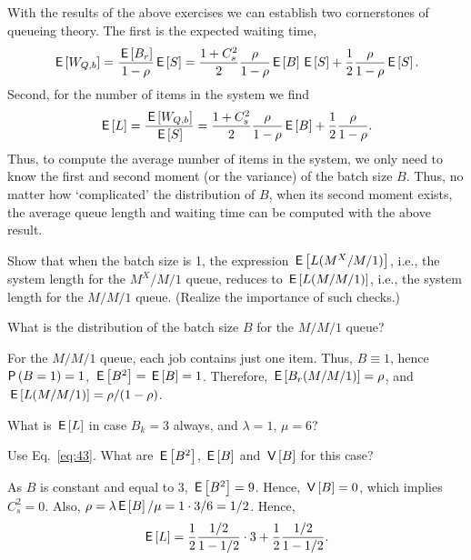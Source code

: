 With the results of the above exercises we can establish two cornerstones of queueing theory. The first is the expected waiting time, 
\begin{equation}
\,\mathsf{E}\left[W_{Q,b}\right] = \frac{\,\mathsf{E}\left[B_r\right]}{1-\rho} \,\mathsf{E}\left[S\right] = 
\frac{1+C_s^2}2 \frac{\rho}{1-\rho} \,\mathsf{E}\left[B\right] \,\mathsf{E}\left[S\right] + \frac12\frac\rho{1-\rho}\,\mathsf{E}\left[S\right].
\end{equation}
Second, for the number of items in the system we find
\begin{equation}\label{eq:43}
\,\mathsf{E}\left[L\right]  =\frac{\,\mathsf{E}\left[W_{Q,b}\right]}{\,\mathsf{E}\left[S\right]} =  
\frac{1+C_s^2}2 \frac{\rho}{1-\rho} \,\mathsf{E}\left[B\right] + \frac12\frac\rho{1-\rho}.
\end{equation}
Thus, to compute the average number of items in the system, we only
need to know the first and second moment (or the variance) of the
batch size $B$. Thus, no matter how `complicated' the distribution of
$B$, when its second moment exists, the average queue length and
waiting time can be computed with the above result. 

\begin{exercise}
  Show that  when the batch size is 1, the expression $\,\mathsf{E}\left[L(M^X/M/1)\right]$, i.e., the system length for the $M^X/M/1$ queue, reduces to
  $\,\mathsf{E}\left[L(M/M/1)\right]$, i.e., the system length for the $M/M/1$ queue. 
(Realize the importance of such checks.)
  \begin{hint}
What is the    distribution of the batch size $B$ for the $M/M/1$ queue?
  \end{hint}
  \begin{solution}
    For the $M/M/1$ queue, each job contains just one item. Thus,
    $B\equiv 1$, hence $\P{B=1}=1$, $\,\mathsf{E}\left[B^2\right]=\,\mathsf{E}\left[B\right] =1$. Therefore,
    $\,\mathsf{E}\left[B_r(M/M/1)\right]= \rho$, and $\,\mathsf{E}\left[L(M/M/1)\right]=\rho/(1-\rho)$. 
  \end{solution}
\end{exercise}


\begin{exercise}
  What is $\,\mathsf{E}\left[L\right]$ in case $B_k=3$ always, and $\lambda=1$, $\mu=6$?  
  \begin{hint}
Use Eq.~\eqref{eq:43}. What are $\,\mathsf{E}\left[B^2\right]$, $\,\mathsf{E}\left[B\right]$ and $\,\mathsf{V}\left[B\right]$ for this case?
  \end{hint}
\begin{solution}
  As $B$ is constant and equal to 3, $\,\mathsf{E}\left[B^2\right]=9$. Hence, $\,\mathsf{V}\left[B\right]=0$, which implies
 $C_s^2=0$.  Also, $\rho=\lambda\,\mathsf{E}\left[B\right]/\mu=1\cdot 3/6=1/2$. Hence,
  \begin{equation*}
    \,\mathsf{E}\left[L\right] = \frac 1 2 \frac{1/2}{1-1/2}\cdot 3 + \frac12\frac{1/2}{1-1/2}.
  \end{equation*}
  \end{solution}
\end{exercise}

